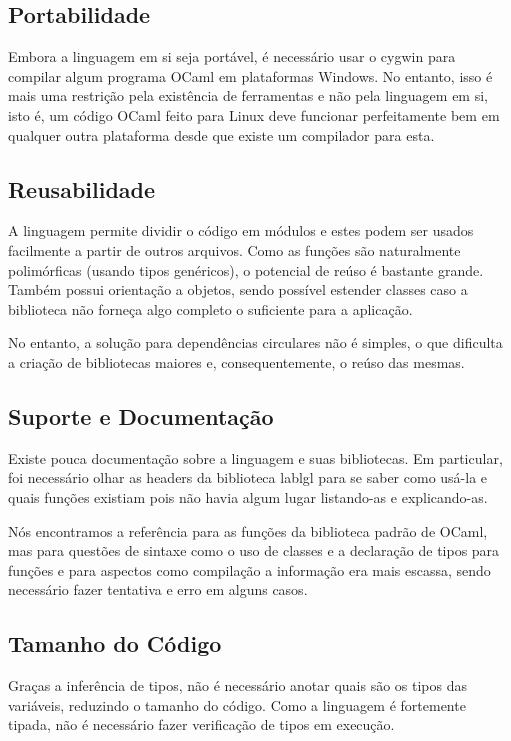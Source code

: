 \documentclass[a4paper,10pt]{article}
\begin{document}
	\subsection{Portabilidade}
		
		Embora a linguagem em si seja portável, é necessário usar o cygwin para compilar algum programa OCaml em plataformas Windows. No entanto, isso é mais uma restrição pela existência de ferramentas e não pela linguagem em si, isto é, um código OCaml feito para Linux deve funcionar perfeitamente bem em qualquer outra plataforma desde que existe um compilador para esta.
		
	\subsection{Reusabilidade}
	
		A linguagem permite dividir o código em módulos e estes podem ser usados facilmente a partir de outros arquivos. Como as funções são naturalmente polimórficas (usando tipos genéricos), o potencial de reúso é bastante grande. Também possui orientação a objetos, sendo possível estender classes caso a biblioteca não forneça algo completo o suficiente para a aplicação.
		
		No entanto, a solução para dependências circulares não é simples, o que dificulta a criação de bibliotecas maiores e, consequentemente, o reúso das mesmas.
	
	\subsection{Suporte e Documentação}
	
		Existe pouca documentação sobre a linguagem e suas bibliotecas. Em particular, foi necessário olhar as headers da biblioteca lablgl para se saber como usá-la e quais funções existiam pois não havia algum lugar listando-as e explicando-as.
		
		Nós encontramos a referência para as funções da biblioteca padrão de OCaml, mas para questões de sintaxe como o uso de classes e a declaração de tipos para funções e para aspectos como compilação a informação era mais escassa, sendo necessário fazer tentativa e erro em alguns casos.
		
	\subsection{Tamanho do Código}
		
		Graças a inferência de tipos, não é necessário anotar quais são os tipos das variáveis, reduzindo o tamanho do código. Como a linguagem é fortemente tipada, não é necessário fazer verificação de tipos em execução.
		
\end{document}
